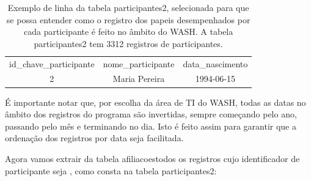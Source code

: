 \documentclass[
12pt,		%
openright,	%
twoside,  %
a4paper,			%
chapter=TITLE,		%
english,			%
french,				%
spanish,			%
brazil				%
]{USPSC-classe/USPSC}
\begin{document}
\begin{table}[htb]
\tiny
\caption{\label{96081f1bc28f7c738012f4beb3ef867b6b67107f}Exemplo de linha da tabela participantes2, selecionada para que se possa entender como o registro dos papeis desempenhados por cada participante \'e feito no \^ambito do WASH. A tabela participantes2 tem 3312 registros de participantes.}

\centering
\begin{tabular}{|c|c|c|}
\hline
id\_chave\_participante  &  nome\_participante             &  data\_nascimento  \\
                     2  &  Maria Pereira  &  1994-06-15 \\
\hline
\end{tabular}
\end{table}


\'E importante notar que, por escolha da \'area de TI do WASH, todas as datas no \^ambito dos registros do programa s\~ao invertidas, sempre come\c{c}ando pelo ano, passando pelo m\^es e terminando no dia. Isto \'e feito assim para garantir que a ordena\c{c}\~ao dos registros por data seja facilitada.










Agora vamos extrair da tabela \textquotedbl afiliacoes\textquotedbl  todos os registros cujo identificador de participante seja \textquotedbl , como consta na tabela participantes2:
\end{document}
